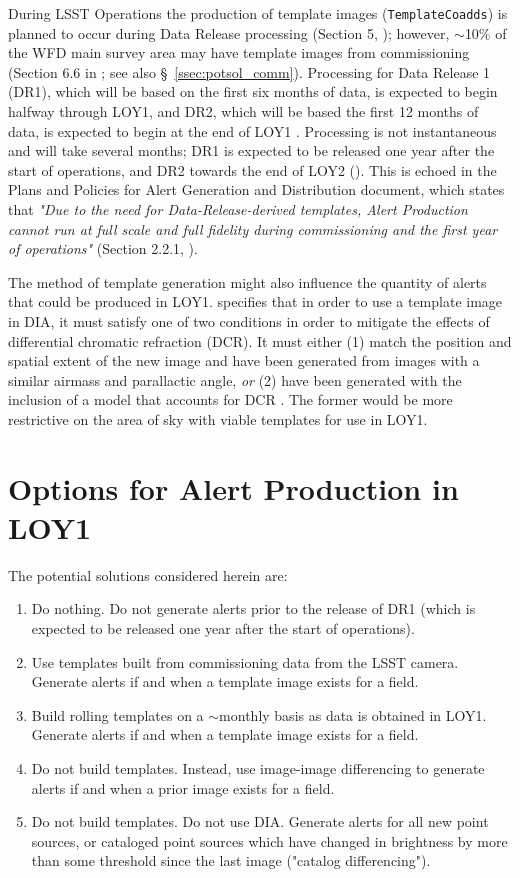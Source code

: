 \documentclass[DM,lsstdraft,toc]{lsstdoc}
\begin{document}
During LSST Operations the production of template images ({\tt TemplateCoadds}) is planned to occur during Data Release processing (Section 5, ); however, $\sim$10\% of the WFD main survey area may have template images from commissioning (Section 6.6 in ; see also \S~\ref{ssec:potsol_comm}).
Processing for Data Release 1 (DR1), which will be based on the first six months of data, is expected to begin halfway through LOY1, and DR2, which will be based the first 12 months of data, is expected to begin at the end of LOY1 .
Processing is not instantaneous and will take several months; DR1 is expected to be released one year after the start of operations, and DR2 towards the end of LOY2 (). 
This is echoed in the Plans and Policies for Alert Generation and Distribution document, which states that {\it "Due to the need for Data-Release-derived templates, Alert Production cannot run at full scale and full fidelity during commissioning and the first year of operations"} (Section 2.2.1, ). 

The method of template generation might also influence the quantity of alerts that could be produced in LOY1.
 specifies that in order to use a template image in DIA, it must satisfy one of two conditions in order to mitigate the effects of differential chromatic refraction (DCR).
It must either (1) match the position and spatial extent of the new image and have been generated from images with a similar airmass and parallactic angle, {\em or} (2) have been generated with the inclusion of a model that accounts for DCR .
The former would be more restrictive on the area of sky with viable templates for use in LOY1.

\clearpage
\section{Options for Alert Production in LOY1}\label{sec:potsol}

The potential solutions considered herein are:
\begin{enumerate}
\item Do nothing. Do not generate alerts prior to the release of DR1 (which is expected to be released one year after the start of operations).
\item Use templates built from commissioning data from the LSST camera. Generate alerts if and when a template image exists for a field. 
\item Build rolling templates on a $\sim$monthly basis as data is obtained in LOY1. Generate alerts if and when a template image exists for a field.
\item Do not build templates. Instead, use image-image differencing to generate alerts if and when a prior image exists for a field.
\item Do not build templates. Do not use DIA. Generate alerts for all new point sources, or cataloged point sources which have changed in brightness by more than some threshold since the last image ("catalog differencing").
\end{enumerate}
\end{document}
